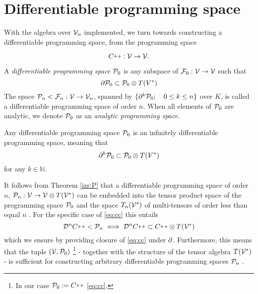 \section{Differentiable programming space}\label{sec:differentiableProgSpace}

With the algebra over $\mathcal{V}_n$ implemented, we turn towards constructing a differentiable programming space, from the programming space
              
\begin{equation}\label{eq:cc}
\CC:\VV\to\VV.
\end{equation}

\begin{definicija}\label{def:dP}
  A \emph{differentiable programming space} $\mathcal{P}_0$ is any subspace of $\mathcal{F}_0:\mathcal{V}\to\mathcal{V}$ such that
  \begin{equation}\label{eq:P}
  \partial\mathcal{P}_0\subset\mathcal{P}_0\otimes T(V^*)
  \end{equation}
  The space $\mathcal{P}_n<\mathcal{F}_n:\mathcal{V}\to\mathcal{V}_n$, spanned by $\{\partial^k\mathcal{P}_0;\quad 0\le k\le n\}$ over $K$, is called a differentiable programming space of order $n$. When all elements of $\mathcal{P}_0$ are analytic, we denote $\mathcal{P}_0$ as an \emph{analytic programming space}. \cite[Definition~4.2]{OperationalCalculus}
 \end{definicija}
              
\begin{izrek}\label{izr:P}
  Any differentiable programming space $\mathcal{P}_0$ is an
  infinitely differentiable programming space, meaning that
  \begin{equation}\label{eq:P_n}
      \partial^k\mathcal{P}_0\subset\mathcal{P}_0\otimes T(V^*)
    \end{equation}
for any $k\in\mathbb{N}$. \cite[Theorem~4.1]{OperationalCalculus}
\end{izrek}

It follows from Theorem \ref{izr:P} that a differentiable programming space of order $n$, $\mathcal{P}_n:\mathcal{V}\to\mathcal{V}\otimes T(\mathcal{V}^*)$ can be embedded into the tensor product space of the programming space $\mathcal{P}_0$ and the space $T_n(\mathcal{V}^*)$ of multi-tensors of order less than equal $n$ \cite[Corollary~4.1.1]{OperationalCalculus}. For the specific case of \eqref{eq:cc} this entails
\begin{equation}
\DD^n\CC<\dP_n\iff\DD^n\CC\subset\CC\otimes T(\VV^*)
\end{equation}
which we ensure by providing closure of \eqref{eq:cc} under $\partial$. Furthermore, this means that the tuple $(\mathcal{V},\mathcal{P}_0)$
\footnote{In our case $\dP_0:=\CC$ \eqref{eq:cc}.}
 - together with the structure of the tensor algebra $T(\mathcal{V}^*)$ - is sufficient for constructing arbitrary differentiable programming spaces $\mathcal{P}_n$ .
              
